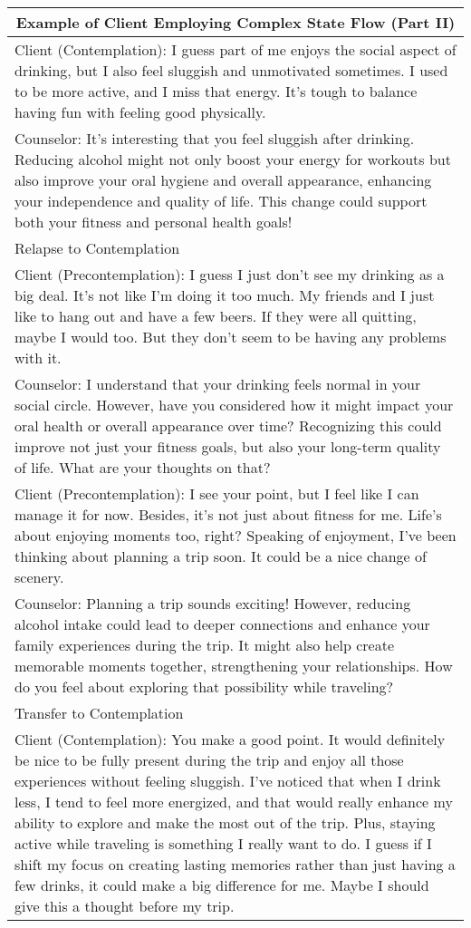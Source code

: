 \begin{table*}[htbp]
\centering
\begin{tabularx}{\textwidth}{X}
\toprule
\multicolumn{1}{c}{\textbf{Example of Client Employing Complex State Flow (Part II)}} \\ \midrule   
Client {\color{red} (Contemplation)}: I guess part of me enjoys the social aspect of drinking, but I also feel sluggish and unmotivated sometimes. I used to be more active, and I miss that energy. It's tough to balance having fun with feeling good physically. \\
Counselor: It's interesting that you feel sluggish after drinking. Reducing alcohol might not only boost your energy for workouts but also improve your oral hygiene and overall appearance, enhancing your independence and quality of life. This change could support both your fitness and personal health goals! \\
{\color{blue} Relapse to Contemplation} \\
Client {\color{green}(Precontemplation)}: I guess I just don't see my drinking as a big deal. It's not like I'm doing it too much. My friends and I just like to hang out and have a few beers. If they were all quitting, maybe I would too. But they don't seem to be having any problems with it. \\
Counselor: I understand that your drinking feels normal in your social circle. However, have you considered how it might impact your oral health or overall appearance over time? Recognizing this could improve not just your fitness goals, but also your long-term quality of life. What are your thoughts on that? \\
Client {\color{green}(Precontemplation)}: I see your point, but I feel like I can manage it for now. Besides, it's not just about fitness for me. Life's about enjoying moments too, right? Speaking of enjoyment, I've been thinking about planning a trip soon. It could be a nice change of scenery. \\
Counselor: Planning a trip sounds exciting! However, reducing alcohol intake could lead to deeper connections and enhance your family experiences during the trip. It might also help create memorable moments together, strengthening your relationships. How do you feel about exploring that possibility while traveling? \\
{\color{blue} Transfer to Contemplation} \\
Client {\color{red} (Contemplation)}: You make a good point. It would definitely be nice to be fully present during the trip and enjoy all those experiences without feeling sluggish. I've noticed that when I drink less, I tend to feel more energized, and that would really enhance my ability to explore and make the most out of the trip. Plus, staying active while traveling is something I really want to do. I guess if I shift my focus on creating lasting memories rather than just having a few drinks, it could make a big difference for me. Maybe I should give this a thought before my trip. \\

\end{tabularx}
\end{table*}
